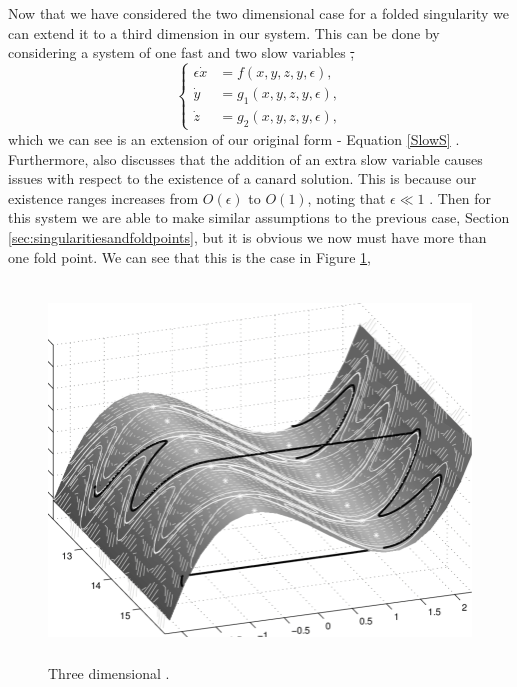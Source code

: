 Now that we have considered the two dimensional case for a folded singularity we can extend it to a third dimension in our system. This can be done by considering a system of one fast and two slow variables \st, 
\begin{equation}
\begin{cases}
\epsilon \dot{x}&=f(x,y,z,y,\epsilon),\\
\dot{y}&=g_1(x,y,z,y,\epsilon),\\
\dot{z}&=g_2(x,y,z,y,\epsilon),
\end{cases}\label{eq: fs singularity system}
\end{equation}
which we can see is an extension of our original form - Equation \ref{SlowS} \citep{MMO}. Furthermore, \citet{MMO} also discusses that the addition of an extra slow variable causes issues with respect to the existence of a canard solution. This is because our existence ranges increases from $ O(\epsilon) $ to $ O(1) $, noting that $ \epsilon\ll 1 $ \citep{MMO}. Then for this system we are able to make similar assumptions to the previous case, Section \ref{sec:singularitiesandfoldpoints}, but it is obvious we now must have more than one fold point. We can see that this is the case in Figure \ref{fig: 3d folded singularity},
\begin{figure}[h!]\centering
	\includegraphics[height=10cm,width=14cm]{Images/Three-dimensional-plot-of-a-trajectory-for-the-van-der-Pol-equation-and-the-critical}
	\caption{Three dimensional \vdp \citep{3D-VdP}.}
	\label{fig: 3d folded singularity}
\end{figure}\newpage
